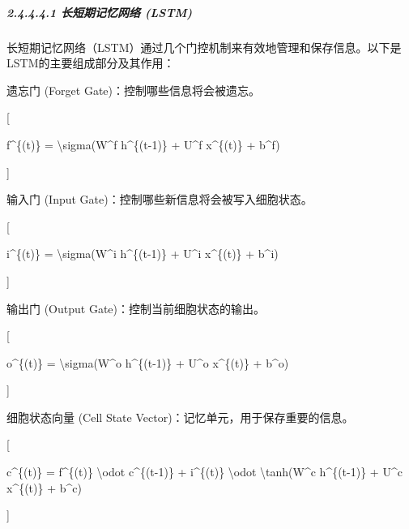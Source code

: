 \subparagraph{\texorpdfstring{\textbf{2.4.4.4.1} \textbf{长短期记忆网络
(LSTM)}}{2.4.4.4.1 长短期记忆网络 (LSTM)}}\label{24441-ux957fux77edux671fux8bb0ux5fc6ux7f51ux7edc-lstm}

长短期记忆网络（LSTM）通过几个门控机制来有效地管理和保存信息。以下是LSTM的主要组成部分及其作用：


遗忘门 (Forget Gate)：控制哪些信息将会被遗忘。

{[}

f\^{}\{(t)\} = \textbackslash sigma(W\^{}f h\^{}\{(t-1)\} + U\^{}f
x\^{}\{(t)\} + b\^{}f)

{]}


输入门 (Input Gate)：控制哪些新信息将会被写入细胞状态。

{[}

i\^{}\{(t)\} = \textbackslash sigma(W\^{}i h\^{}\{(t-1)\} + U\^{}i
x\^{}\{(t)\} + b\^{}i)

{]}


输出门 (Output Gate)：控制当前细胞状态的输出。

{[}

o\^{}\{(t)\} = \textbackslash sigma(W\^{}o h\^{}\{(t-1)\} + U\^{}o
x\^{}\{(t)\} + b\^{}o)

{]}


细胞状态向量 (Cell State Vector)：记忆单元，用于保存重要的信息。

{[}

c\^{}\{(t)\} = f\^{}\{(t)\} \textbackslash odot c\^{}\{(t-1)\} +
i\^{}\{(t)\} \textbackslash odot \textbackslash tanh(W\^{}c
h\^{}\{(t-1)\} + U\^{}c x\^{}\{(t)\} + b\^{}c)

{]}


